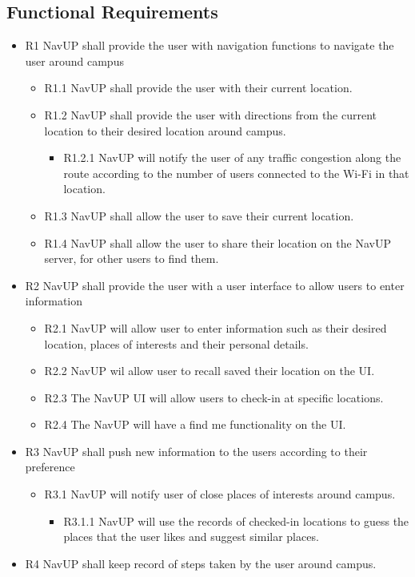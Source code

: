 \documentclass{article}
\begin{document}
    \subsection{Functional Requirements}
    	\begin{itemize}
    	\item R1 NavUP shall provide the user with navigation functions to navigate the user around campus
        \begin{itemize}
        \item R1.1 NavUP shall provide the user with their current location.
        \item R1.2 NavUP shall provide the user with directions from the current location to their desired location around campus.
        \begin{itemize}
        \item R1.2.1 NavUP will notify the user of any traffic congestion along the route according to the number of users connected to the Wi-Fi in that location.
        \end{itemize}
        \item R1.3 NavUP shall allow the user to save their current location.
        \item R1.4 NavUP shall allow the user to share their location on the NavUP server, for other users to find them.
        \end{itemize}
        \item R2 NavUP shall provide the user with a user interface to allow users to enter information
        \begin{itemize}
        \item R2.1 NavUP will allow user to enter information such as their desired location, places of interests and their personal details.
        \item R2.2 NavUP wil allow user to recall saved their location on the UI.
        \item R2.3 The NavUP UI will allow users to check-in at specific locations.
        \item R2.4 The NavUP will have a find me functionality on the UI.
        \end{itemize}
        \item R3 NavUP shall push new information to the users according to their preference
        \begin{itemize}
        \item R3.1 NavUP will notify user of close places of interests around campus.
        \begin{itemize}
        \item R3.1.1 NavUP will use the records of checked-in locations to guess the places that the user likes and suggest similar places. 
        \end{itemize}
        \end{itemize}
        \item R4 NavUP shall keep record of steps taken by the user around campus.
    	\end{itemize}
\end{document}
